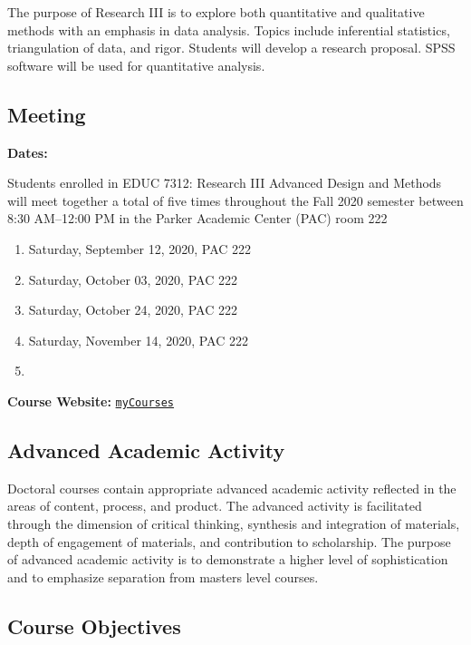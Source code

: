 \documentclass[
]{article}
\begin{document}
The purpose of Research III is to explore both quantitative and
qualitative methods with an emphasis in data analysis. Topics include
inferential statistics, triangulation of data, and rigor. Students will
develop a research proposal. SPSS software will be used for quantitative
analysis.

\subsection{Meeting}

\textbf{Dates:}

Students enrolled in EDUC 7312: Research III Advanced Design and Methods
will meet together a total of five times throughout the Fall 2020
semester between 8:30 AM--12:00 PM in the Parker Academic Center (PAC)
room 222

\begin{enumerate}
\def\labelenumi{\arabic{enumi}.}
\item
  Saturday, September 12, 2020, PAC 222
\item
  Saturday, October 03, 2020, PAC 222
\item
  Saturday, October 24, 2020, PAC 222
\item
  Saturday, November 14, 2020, PAC 222
\item
\end{enumerate}

\textbf{Course Website:}
\texttt{\href{https://mycourses.umhb.edu/courses/23599}{myCourses}}

\newpage
\subsection{Advanced Academic Activity}

Doctoral courses contain appropriate advanced academic activity
reflected in the areas of content, process, and product. The advanced
activity is facilitated through the dimension of critical thinking,
synthesis and integration of materials, depth of engagement of
materials, and contribution to scholarship. The purpose of advanced
academic activity is to demonstrate a higher level of sophistication and
to emphasize separation from masters level courses.

\subsection{Course Objectives}
\end{document}
